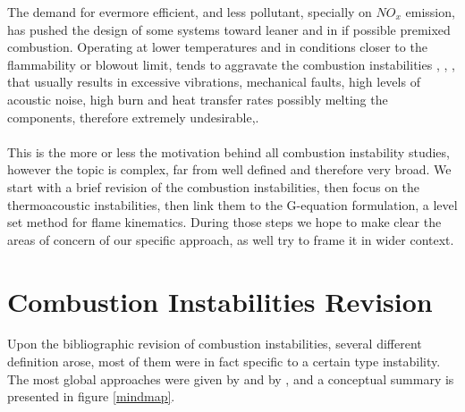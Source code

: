 The demand for evermore efficient, and less pollutant, specially on $NO_x$ emission, has pushed the design of some systems toward leaner and in if possible premixed combustion. Operating at lower temperatures and in conditions closer to the flammability or blowout limit, tends to aggravate the combustion instabilities \cite{candel}, \cite{lefebvre}, \cite{ghoniem}, that usually results in excessive vibrations, mechanical faults, high levels of acoustic noise, high burn and heat transfer rates possibly melting the components, therefore extremely undesirable,\cite{prateep}.
\\\\
This is the more or less the motivation behind all combustion instability studies, however the topic is complex, far from well defined and therefore very broad.  We start with a brief revision of the combustion instabilities, then focus on the thermoacoustic instabilities, then link them to the G-equation formulation, a level set method for flame kinematics. During those steps we hope to make clear the areas of concern of our specific approach, as well try to frame it in wider context.



\newpage 
\section{Combustion Instabilities Revision}
Upon the bibliographic revision of combustion instabilities, several different definition arose, most of them were in fact specific to a certain type instability. The most global approaches were given by \cite{candel} and by \cite{barrere},  and a conceptual summary is presented in figure \ref{mindmap}.

